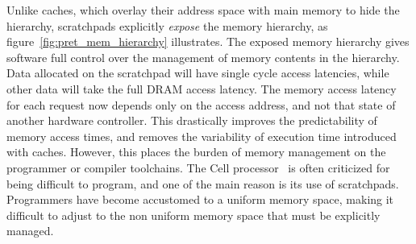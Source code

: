Unlike caches, which overlay their address space with main memory to hide the hierarchy, scratchpads explicitly \emph{expose} the memory hierarchy, as figure~\ref{fig:pret_mem_hierarchy} illustrates.  
The exposed memory hierarchy gives software full control over the management of memory contents in the hierarchy.
Data allocated on the scratchpad will have single cycle access latencies, while other data will take the full DRAM access latency. 
The memory access latency for each request now depends only on the access address, and not that state of another hardware controller. 
This drastically improves the predictability of memory access times, and removes the variability of execution time introduced with caches.
However, this places the burden of memory management on the programmer or compiler toolchains.  
The Cell processor~\cite{cellproc} is often criticized for being difficult to program, and one of the main reason is its use of scratchpads. 
Programmers have become accustomed to a uniform memory space, making it difficult to adjust to the non uniform memory space that must be explicitly managed.

